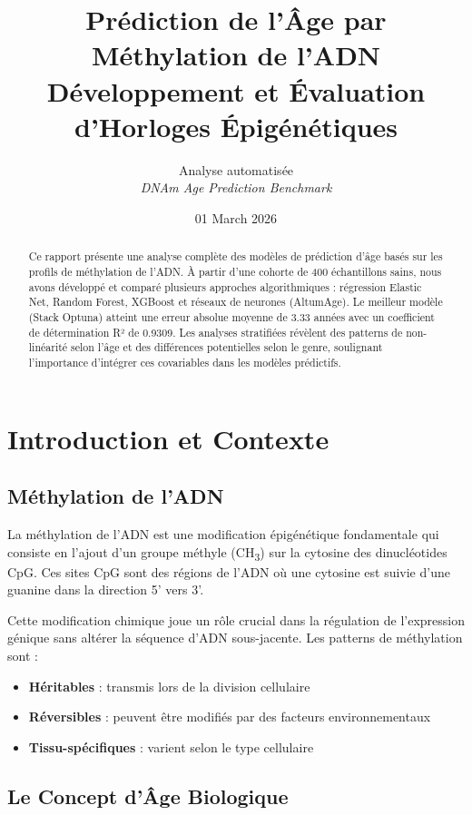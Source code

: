 \documentclass[11pt,a4paper]{article}
\title{
    \vspace{-1cm}
    \textbf{Prédiction de l'Âge par Méthylation de l'ADN} \\
    \large Développement et Évaluation d'Horloges Épigénétiques
}
\author{
    Analyse automatisée \\
    \textit{DNAm Age Prediction Benchmark}
}
\date{01 March 2026}
\begin{document}
\maketitle

\begin{abstract}
Ce rapport présente une analyse complète des modèles de prédiction d'âge basés sur les 
profils de méthylation de l'ADN. À partir d'une cohorte de 400 échantillons sains, 
nous avons développé et comparé plusieurs approches algorithmiques : régression Elastic Net, 
Random Forest, XGBoost et réseaux de neurones (AltumAge). Le meilleur modèle (Stack Optuna) 
atteint une erreur absolue moyenne de 3.33 années avec un 
coefficient de détermination R² de 0.9309. Les analyses stratifiées 
révèlent des patterns de non-linéarité selon l'âge et des différences potentielles selon le 
genre, soulignant l'importance d'intégrer ces covariables dans les modèles prédictifs.
\end{abstract}

\tableofcontents
\newpage


\section{Introduction et Contexte}

\subsection{Méthylation de l'ADN}

La méthylation de l'ADN est une modification épigénétique fondamentale qui consiste en l'ajout 
d'un groupe méthyle (CH\textsubscript{3}) sur la cytosine des dinucléotides CpG. Ces sites CpG 
sont des régions de l'ADN où une cytosine est suivie d'une guanine dans la direction 5' vers 3'.

Cette modification chimique joue un rôle crucial dans la régulation de l'expression génique sans 
altérer la séquence d'ADN sous-jacente. Les patterns de méthylation sont :
\begin{itemize}
    \item \textbf{Héritables} : transmis lors de la division cellulaire
    \item \textbf{Réversibles} : peuvent être modifiés par des facteurs environnementaux
    \item \textbf{Tissu-spécifiques} : varient selon le type cellulaire
\end{itemize}

\subsection{Le Concept d'Âge Biologique}
\end{document}
